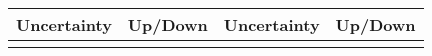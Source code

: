 \footnotesize
\begin{table}[p]
\begin{center}
\begin{tabular}{c|c||c|c}
\hline \hline
Uncertainty & Up/Down & Uncertainty & Up/Down \\
\hline \hline
 &  &  &  \\
\hline \hline
\end{tabular}
\end{center}
\end{table}
\normalsize

